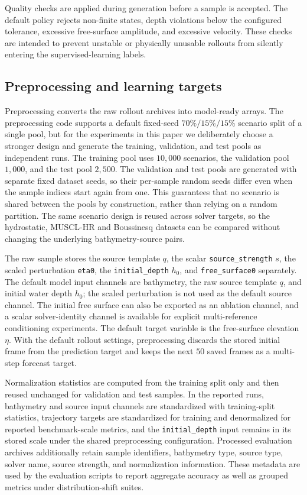Quality checks are applied during generation before a sample is accepted. The default policy rejects non-finite states, depth violations below the configured tolerance, excessive free-surface amplitude, and excessive velocity. These checks are intended to prevent unstable or physically unusable rollouts from silently entering the supervised-learning labels.

\subsection{Preprocessing and learning targets}
\label{subsec:preprocessing-targets}

Preprocessing converts the raw rollout archives into model-ready arrays. The preprocessing code supports a default fixed-seed $70\%/15\%/15\%$ scenario split of a single pool, but for the experiments in this paper we deliberately choose a stronger design and generate the training, validation, and test pools as independent runs. The training pool uses $10{,}000$ scenarios, the validation pool $1{,}000$, and the test pool $2{,}500$. The validation and test pools are generated with separate fixed dataset seeds, so their per-sample random seeds differ even when the sample indices start again from one. This guarantees that no scenario is shared between the pools by construction, rather than relying on a random partition. The same scenario design is reused across solver targets, so the hydrostatic, MUSCL-HR and Boussinesq datasets can be compared without changing the underlying bathymetry-source pairs.

The raw sample stores the source template $q$, the scalar \texttt{source\_strength} $s$, the scaled perturbation \texttt{eta0}, the \texttt{initial\_depth} $h_0$, and \texttt{free\_surface0} separately. The default model input channels are bathymetry, the raw source template $q$, and initial water depth $h_0$; the scaled perturbation is not used as the default source channel. The initial free surface can also be exported as an ablation channel, and a scalar solver-identity channel is available for explicit multi-reference conditioning experiments. The default target variable is the free-surface elevation $\eta$. With the default rollout settings, preprocessing discards the stored initial frame from the prediction target and keeps the next $50$ saved frames as a multi-step forecast target.

Normalization statistics are computed from the training split only and then reused unchanged for validation and test samples. In the reported runs, bathymetry and source input channels are standardized with training-split statistics, trajectory targets are standardized for training and denormalized for reported benchmark-scale metrics, and the \texttt{initial\_depth} input remains in its stored scale under the shared preprocessing configuration. Processed evaluation archives additionally retain sample identifiers, bathymetry type, source type, solver name, source strength, and normalization information. These metadata are used by the evaluation scripts to report aggregate accuracy as well as grouped metrics under distribution-shift suites.


